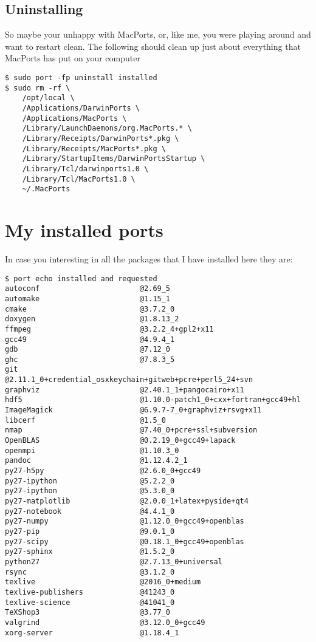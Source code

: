 \documentclass[11pt, A4paper]{article}
\begin{document}
\subsection{Uninstalling}
So maybe your unhappy with MacPorts, or, like me, you were playing around and want to restart clean. The following should clean up just about everything that MacPorts has put on your computer
\begin{lstlisting}[style=Bash]
$ sudo port -fp uninstall installed
$ sudo rm -rf \
    /opt/local \
    /Applications/DarwinPorts \
    /Applications/MacPorts \
    /Library/LaunchDaemons/org.MacPorts.* \
    /Library/Receipts/DarwinPorts*.pkg \
    /Library/Receipts/MacPorts*.pkg \
    /Library/StartupItems/DarwinPortsStartup \
    /Library/Tcl/darwinports1.0 \
    /Library/Tcl/MacPorts1.0 \
    ~/.MacPorts
\end{lstlisting}



%
%
\appendix

\section{My installed ports}

In case you interesting in all the packages that I have installed here they are:
\begin{lstlisting}[style=Bash]
$ port echo installed and requested
autoconf                       @2.69_5 
automake                       @1.15_1 
cmake                          @3.7.2_0 
doxygen                        @1.8.13_2 
ffmpeg                         @3.2.2_4+gpl2+x11 
gcc49                          @4.9.4_1 
gdb                            @7.12_0 
ghc                            @7.8.3_5 
git                            @2.11.1_0+credential_osxkeychain+gitweb+pcre+perl5_24+svn 
graphviz                       @2.40.1_1+pangocairo+x11 
hdf5                           @1.10.0-patch1_0+cxx+fortran+gcc49+hl 
ImageMagick                    @6.9.7-7_0+graphviz+rsvg+x11 
libcerf                        @1.5_0 
nmap                           @7.40_0+pcre+ssl+subversion 
OpenBLAS                       @0.2.19_0+gcc49+lapack 
openmpi                        @1.10.3_0 
pandoc                         @1.12.4.2_1 
py27-h5py                      @2.6.0_0+gcc49 
py27-ipython                   @5.2.2_0 
py27-ipython                   @5.3.0_0 
py27-matplotlib                @2.0.0_1+latex+pyside+qt4 
py27-notebook                  @4.4.1_0 
py27-numpy                     @1.12.0_0+gcc49+openblas 
py27-pip                       @9.0.1_0 
py27-scipy                     @0.18.1_0+gcc49+openblas 
py27-sphinx                    @1.5.2_0 
python27                       @2.7.13_0+universal 
rsync                          @3.1.2_0 
texlive                        @2016_0+medium 
texlive-publishers             @41243_0 
texlive-science                @41041_0 
TeXShop3                       @3.77_0 
valgrind                       @3.12.0_0+gcc49 
xorg-server                    @1.18.4_1 
\end{lstlisting}
\end{document}
